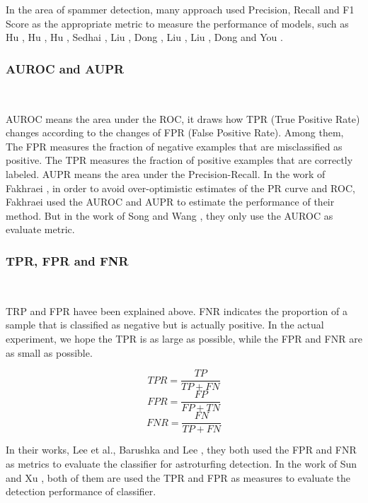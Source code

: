 \documentclass[lettersize,journal]{IEEEtran}
\begin{document}
In the area of spammer detection, many approach used Precision, Recall and F1 Score as the appropriate metric to measure the performance of models, such as 
	Hu \cite{Hu2013Social}, 
	Hu \cite{Hu2014LeveragingKA}, 
	Hu \cite{Hu2014Online}, 
	Sedhai \cite{Sedhai2015HSpam14}, 
	Liu  \cite{Liu2016PayMA}, 
	Dong  \cite{dong2018unsupervised}, 
	Liu 	\cite{liu2018unified}, 
	Liu  \cite{liu2019opinion}, 
	Dong  \cite{dong2020opinion} and  
	You \cite{you2020integrating}.


\subsubsection{AUROC and AUPR}
\

AUROC means the area under the ROC, it draws how TPR (True Positive Rate) changes according to the changes of FPR (False Positive Rate). Among them, The FPR measures the fraction of negative examples that are misclassified as positive. The TPR measures the fraction of positive examples that are correctly labeled. AUPR means the area under the Precision-Recall.
In the work of Fakhraei \cite{Fakhraei2015Collective}, in order to avoid over-optimistic estimates of the PR curve and ROC, Fakhraei used the AUROC and AUPR to estimate the performance of their method. But in the work of Song \cite{Song2015CrowdTarget} and Wang \cite{Wang2015DetectingIH}, they only use the AUROC as evaluate metric.

\subsubsection{TPR, FPR and FNR}
\

TRP and FPR havee been explained above. FNR indicates the proportion of a sample that is classified as negative but is actually positive. In the actual experiment, we hope the TPR is as large as possible, while the FPR and FNR are as small as possible.

\[TPR = \frac{TP}{TP+FN}\]
\[FPR = \frac{FP}{FP+TN}\]
\[FNR = \frac{FN}{TP+FN}\]

In their works, Lee et al.\cite{Lee2015CharacterizingAA}, Barushka \cite{barushka2020spam} and Lee \cite{Lee2013Crowdturfers}, they both used the FPR and FNR as metrics to evaluate the classifier for astroturfing detection. In the work of Sun \cite{Sun2013SyntheticRS} and Xu \cite{Xu2015RevealingCA}, both of them are used the TPR and FPR as measures to evaluate the detection performance of classifier.
\end{document}
